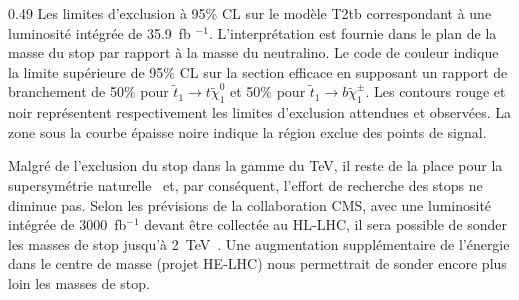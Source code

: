                  {0.49}       %
                 {Les limites d'exclusion à 95\% CL sur le modèle T2tb correspondant à une luminosité intégrée de 35.9~fb $^{-1}$. L'interprétation est fournie dans le plan de la masse du stop par rapport à la masse du neutralino. Le code de couleur indique la limite supérieure de 95\% CL sur la section efficace en supposant un rapport de branchement de 50\% pour $\tilde{t}_{1} \to t \tilde {\chi}^{0}_{1} $ et 50\% pour $\tilde{t}_{1} \to b \tilde{\chi}^{\pm}_{1} $. Les contours rouge et noir représentent respectivement les limites d'exclusion attendues et observées. La zone sous la courbe épaisse noire indique la région exclue des points de signal. }



Malgré de l’exclusion du stop dans la gamme du TeV, il reste de la place pour la supersymétrie naturelle~\cite{Baer:2016bwh} et, par conséquent, l’effort de recherche des stops ne diminue pas. Selon les prévisions de la collaboration CMS, avec une luminosité intégrée de 3000~fb$^{-1} $ devant être collectée au HL-LHC, il sera possible de sonder les masses de stop jusqu'à 2~TeV~\cite{website:moriond}. Une augmentation supplémentaire de l’énergie dans le centre de masse (projet HE-LHC)  nous permettrait de sonder encore plus loin les masses de stop.


